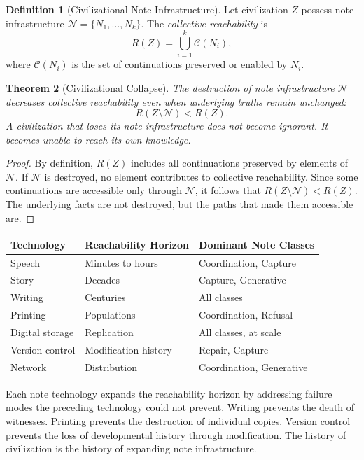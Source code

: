 \documentclass[12pt, a4paper, openany]{book}
\theoremstyle{plain}
\newtheorem{theorem}{Theorem}[chapter]
\theoremstyle{definition}
\newtheorem{definition}[theorem]{Definition}
\theoremstyle{remark}
\newcommand{\calC}{\mathcal{C}}
\newcommand{\calN}{\mathcal{N}}
\begin{document}
\begin{definition}[Civilizational Note Infrastructure]
Let civilization $Z$ possess note infrastructure $\calN = \{N_1, \ldots, N_k\}$.
The \emph{collective reachability} is
\[
R(Z) = \bigcup_{i=1}^{k} \calC(N_i),
\]
where $\calC(N_i)$ is the set of continuations preserved or enabled by $N_i$.
\end{definition}

\begin{theorem}[Civilizational Collapse]
The destruction of note infrastructure $\calN$ decreases collective reachability
even when underlying truths remain unchanged:
\[
R(Z \setminus \calN) < R(Z).
\]
A civilization that loses its note infrastructure does not become ignorant. It
becomes unable to reach its own knowledge.
\end{theorem}

\begin{proof}
By definition, $R(Z)$ includes all continuations preserved by elements of $\calN$.
If $\calN$ is destroyed, no element contributes to collective reachability. Since
some continuations are accessible only through $\calN$, it follows that
$R(Z \setminus \calN) < R(Z)$. The underlying facts are not destroyed, but the
paths that made them accessible are.
\end{proof}

\begin{center}
\begin{tabular}{lll}
\toprule
Technology & Reachability Horizon & Dominant Note Classes \\
\midrule
Speech & Minutes to hours & Coordination, Capture \\
Story & Decades & Capture, Generative \\
Writing & Centuries & All classes \\
Printing & Populations & Coordination, Refusal \\
Digital storage & Replication & All classes, at scale \\
Version control & Modification history & Repair, Capture \\
Network & Distribution & Coordination, Generative \\
\bottomrule
\end{tabular}
\end{center}

Each note technology expands the reachability horizon by addressing failure modes
the preceding technology could not prevent. Writing prevents the death of
witnesses. Printing prevents the destruction of individual copies. Version control
prevents the loss of developmental history through modification. The history of
civilization is the history of expanding note infrastructure.
\end{document}

